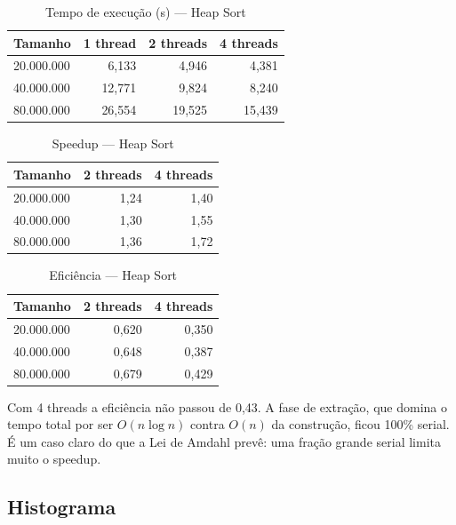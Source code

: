 \documentclass[12pt]{article}
\begin{document}
\begin{table}[H]
\centering
\caption{Tempo de execução (s) --- Heap Sort}
\begin{tabular}{lrrr}
\toprule
\textbf{Tamanho} & \textbf{1 thread} & \textbf{2 threads} & \textbf{4 threads} \\
\midrule
20.000.000 & 6,133 & 4,946 & 4,381 \\
40.000.000 & 12,771 & 9,824 & 8,240 \\
80.000.000 & 26,554 & 19,525 & 15,439 \\
\bottomrule
\end{tabular}
\end{table}

\begin{table}[H]
\centering
\caption{Speedup --- Heap Sort}
\begin{tabular}{lrr}
\toprule
\textbf{Tamanho} & \textbf{2 threads} & \textbf{4 threads} \\
\midrule
20.000.000 & 1,24 & 1,40 \\
40.000.000 & 1,30 & 1,55 \\
80.000.000 & 1,36 & 1,72 \\
\bottomrule
\end{tabular}
\end{table}

\begin{table}[H]
\centering
\caption{Eficiência --- Heap Sort}
\begin{tabular}{lrr}
\toprule
\textbf{Tamanho} & \textbf{2 threads} & \textbf{4 threads} \\
\midrule
20.000.000 & 0,620 & 0,350 \\
40.000.000 & 0,648 & 0,387 \\
80.000.000 & 0,679 & 0,429 \\
\bottomrule
\end{tabular}
\end{table}

Com 4 threads a eficiência não passou de 0,43. A fase de extração, que domina o tempo total por ser $O(n \log n)$ contra $O(n)$ da construção, ficou 100\% serial. É um caso claro do que a Lei de Amdahl prevê: uma fração grande serial limita muito o speedup.

\subsection{Histograma}
\end{document}
